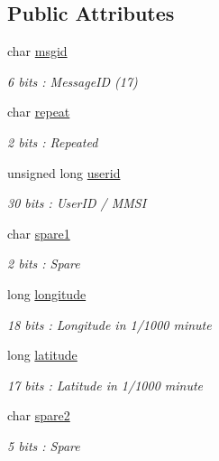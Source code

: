 \subsection*{Public Attributes}
\begin{DoxyCompactItemize}
\item 
char \mbox{\hyperlink{structaismsg__17_ad1ed96391525853f34323499e6fa2040}{msgid}}
\begin{DoxyCompactList}\small\item\em 6 bits \+: Message\+ID (17) \end{DoxyCompactList}\item 
char \mbox{\hyperlink{structaismsg__17_a05d124ed703c5fa11963fd2a24303300}{repeat}}
\begin{DoxyCompactList}\small\item\em 2 bits \+: Repeated \end{DoxyCompactList}\item 
unsigned long \mbox{\hyperlink{structaismsg__17_ac5e1b074133bdc942c3dd5fd13b420f8}{userid}}
\begin{DoxyCompactList}\small\item\em 30 bits \+: User\+ID / M\+M\+SI \end{DoxyCompactList}\item 
char \mbox{\hyperlink{structaismsg__17_a09ac75cd600194f44f44cf6e1fa61ea1}{spare1}}
\begin{DoxyCompactList}\small\item\em 2 bits \+: Spare \end{DoxyCompactList}\item 
long \mbox{\hyperlink{structaismsg__17_a15bc801d51c5e0a5c666644f144452f5}{longitude}}
\begin{DoxyCompactList}\small\item\em 18 bits \+: Longitude in 1/1000 minute \end{DoxyCompactList}\item 
long \mbox{\hyperlink{structaismsg__17_a92c4c3008fe1da2ae4ab588cece719d3}{latitude}}
\begin{DoxyCompactList}\small\item\em 17 bits \+: Latitude in 1/1000 minute \end{DoxyCompactList}\item 
char \mbox{\hyperlink{structaismsg__17_ac19c0a28b731cd7764c9b06fec986689}{spare2}}
\begin{DoxyCompactList}\small\item\em 5 bits \+: Spare \end{DoxyCompactList}\item 

\end{DoxyCompactItemize}
